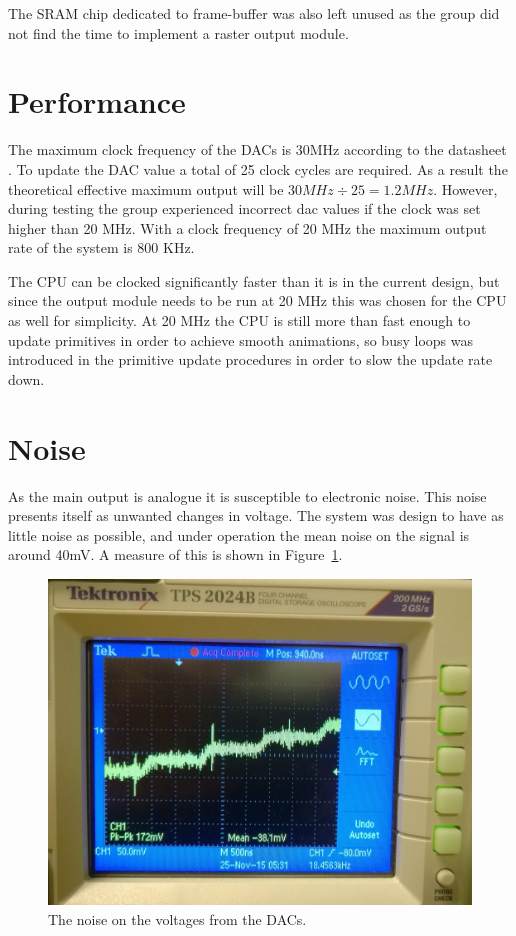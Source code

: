 The SRAM chip dedicated to frame-buffer was also left unused as the group did not find the time to implement a raster output module.

\section{Performance}

The maximum clock frequency of the DACs is 30MHz according to the datasheet \cite{dac-datasheet}.
To update the DAC value a total of 25 clock cycles are required.
As a result the theoretical effective maximum output will be \(30 MHz \div 25 = 1.2 MHz \).
However, during testing the group experienced incorrect \gls{dac} values if the clock was set higher than 20 MHz.
With a clock frequency of 20 MHz the maximum output rate of the system is 800 KHz.

The CPU can be clocked significantly faster than it is in the current design, but since the output module needs to be run at 20 MHz this was chosen for the CPU as well for simplicity.
At 20 MHz the CPU is still more than fast enough to update primitives in order to achieve smooth animations, so busy loops was introduced in the primitive update procedures in order to slow the update rate down.

\section{Noise}
\label{sec:noise}
As the main output is analogue it is susceptible to electronic noise. This noise presents itself as unwanted changes in voltage. 
The system was design to have as little noise as possible, and under operation the mean noise on the signal is around 40mV.
A measure of this is shown in Figure~\ref{fig:noise}.

\begin{figure}[H]
	    \includegraphics[width=\linewidth]{images/noise}
	    \caption{The noise on the voltages from the DACs.}
	    \label{fig:noise}
\end{figure}

